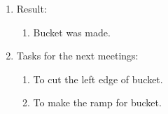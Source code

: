 \begin{enumerate}
\begin{enumerate}
    \end{enumerate}
    
	\item Result: 
	\begin{enumerate}
	  \item Bucket was made.
      
    \end{enumerate}
    
	\item Tasks for the next meetings:
	\begin{enumerate}
	  \item To cut the left edge of bucket.
	  
	  \item To make the ramp for bucket.
    \end{enumerate}     
\end{enumerate}
\fillpage